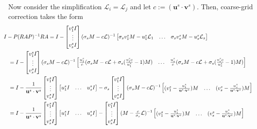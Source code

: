 \documentclass[a4paper,10pt]{article}
\begin{document}
Now consider the simplification $\mathcal{L}_i = \mathcal{L}_j$ and let $c :=
(\mathbf{u}^s\cdot\mathbf{v}^s)$. Then, coarse-grid correction takes the form
%
\begin{align*}
& \hspace{-2ex} I - P(RAP)^{-1}RA = I - 
	\begin{bmatrix} {v}^s_1 I \\ \vdots \\ {v}^s_s I\end{bmatrix}
	(\sigma_sM - c\mathcal{L})^{-1}
	\begin{bmatrix} \sigma_s{v}^s_1M - {u}^s_1 \mathcal{L}_1 & \hdots &
		\sigma_s{v}^s_sM - {u}^s_s \mathcal{L}_s \end{bmatrix} \\
& = I -  \begin{bmatrix} {v}^s_1 I \\ \vdots \\ {v}^s_s I\end{bmatrix}
	(\sigma_sM - c\mathcal{L})^{-1}
	\begin{bmatrix} \tfrac{{u}^s_1}{c}(\sigma_sM - c\mathcal{L} +
		\sigma_s(\tfrac{{v}^s_1c}{{u}^s_1} - 1)M) & \hdots &
	\tfrac{{u}^s_s}{c}(\sigma_sM - c\mathcal{L} +
		\sigma_s(\tfrac{{v}^s_sc}{{u}^s_s} - 1)M) \end{bmatrix} \\
& = I - \frac{1}{\mathbf{u}^s\cdot\mathbf{v}^s}
	\begin{bmatrix} {v}^s_1 I \\ \vdots \\ {v}^s_s I\end{bmatrix}
	\begin{bmatrix} {u}^s_1 I & \hdots & {u}^s_s I\end{bmatrix}
	- \sigma_s\begin{bmatrix} {v}^s_1 I \\ \vdots \\ {v}^s_s I\end{bmatrix}
	(\sigma_sM - c\mathcal{L})^{-1}
	\begin{bmatrix} ({v}^s_1 - \tfrac{u^s_1}{\mathbf{u}^s\cdot\mathbf{v}^s}) M &
		\hdots & ({v}^s_s - \tfrac{u^s_s}{\mathbf{u}^s\cdot\mathbf{v}^s}) M\end{bmatrix} \\
& = I - \frac{1}{\mathbf{u}^s\cdot\mathbf{v}^s}
	\begin{bmatrix} {v}^s_1 I \\ \vdots \\ {v}^s_s I\end{bmatrix}
	\begin{bmatrix} {u}^s_1 I & \hdots & {u}^s_s I\end{bmatrix}
	- \begin{bmatrix} {v}^s_1 I \\ \vdots \\ {v}^s_s I\end{bmatrix}
	(M - \tfrac{c}{\sigma_s}\mathcal{L})^{-1}
	\begin{bmatrix} ({v}^s_1 - \tfrac{u^s_1}{\mathbf{u}^s\cdot\mathbf{v}^s}) M &
		\hdots & ({v}^s_s - \tfrac{u^s_s}{\mathbf{u}^s\cdot\mathbf{v}^s}) M \end{bmatrix}
\end{align*}
%
\end{document}
